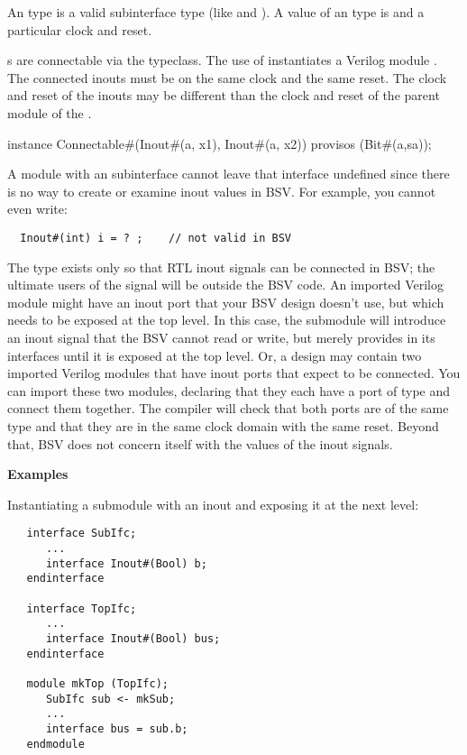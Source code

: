 An  type is a valid subinterface type (like  and
).  A value of an  type is  and
 a particular clock and reset. 



s are connectable via the  typeclass. The
  use of  instantiates a Verilog module
  .  The connected inouts must be on the same clock
and  the same reset.  The clock and reset of the
inouts may be different than the clock and reset of the parent
module of the . 
\begin{libverbatim}
  instance Connectable#(Inout#(a, x1), Inout#(a, x2))
     provisos (Bit#(a,sa));
\end{libverbatim}

 A module with an  subinterface cannot leave that interface
 undefined since there is no way to create or examine inout values in 
BSV.  For example, you cannot even write:
\begin{verbatim}
  Inout#(int) i = ? ;    // not valid in BSV
\end{verbatim}

The
 type exists only so that RTL inout signals can be connected
 in BSV; the ultimate users of the signal will be outside the
BSV code.   An imported Verilog module might have an inout
port that your BSV design doesn't use, but which needs to be exposed
at the top level.  In this case, the submodule will introduce an
inout signal that the BSV cannot read or write, but merely
provides in its interfaces until it is exposed at the top level.  Or,
 a design  may contain two imported Verilog modules that
 have  inout ports that expect to be connected.  You can
 import these  two modules, declaring that they each have a
port of type  and connect them together.  The compiler
will check that both ports are of the same type  and that they are
in the same clock domain with  the same reset.  Beyond that, BSV does
not concern itself with the values of the inout signals.

{\bf Examples}

Instantiating a submodule with an inout and exposing
it at the next level:
\begin{verbatim}
   interface SubIfc;
      ...
      interface Inout#(Bool) b;
   endinterface

   interface TopIfc;
      ...
      interface Inout#(Bool) bus;
   endinterface

   module mkTop (TopIfc);
      SubIfc sub <- mkSub;
      ...
      interface bus = sub.b;
   endmodule
\end{verbatim}

